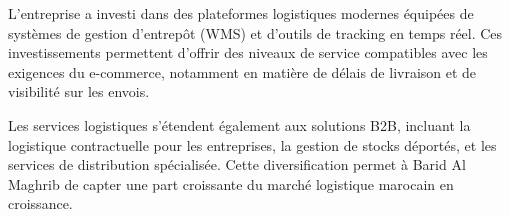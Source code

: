 L'entreprise a investi dans des plateformes logistiques modernes équipées de systèmes de gestion d'entrepôt (WMS) et d'outils de tracking en temps réel. Ces investissements permettent d'offrir des niveaux de service compatibles avec les exigences du e-commerce, notamment en matière de délais de livraison et de visibilité sur les envois.

Les services logistiques s'étendent également aux solutions B2B, incluant la logistique contractuelle pour les entreprises, la gestion de stocks déportés, et les services de distribution spécialisée. Cette diversification permet à Barid Al Maghrib de capter une part croissante du marché logistique marocain en croissance.